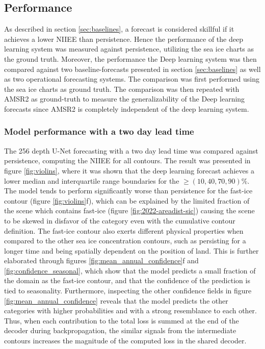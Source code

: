 \documentclass[../main/thesis]{subfiles}
\begin{document}
\subsection{Performance}
As described in section \ref{sec:baselines}, a forecast is considered skillful if it achieves a lower NIIEE than persistence. Hence the performance of the deep learning system was measured against persistence, utilizing the sea ice charts as the ground truth. Moreover, the performance the Deep learning system was then compared against two baseline-forecasts presented in section \ref{sec:baselines} as well as two operational forecasting systems. The comparison was first performed using the sea ice charts as ground truth. The comparison was then repeated with AMSR2 as ground-truth to measure the generalizability of the Deep learning forecasts since AMSR2 is completely independent of the deep learning system.

\subsubsection{Model performance with a two day lead time}
\label{sec:performance_confidence}
The 256 depth U-Net forecasting with a two day lead time was compared against persistence, computing the NIIEE for all contours. The result was presented in figure \ref{fig:violins}, where it was shown that the deep learning forecast achieves a lower median and interquartile range boundaries for the $\geq (10, 40, 70, 90)\%$. The model tends to perform significantly worse than persistence for the fast-ice contour (figure \ref{fig:violins}f), which can be explained by the limited fraction of the scene which contains fast-ice (figure \ref{fig:2022-areadist-sic}) causing the scene to be skewed in disfavor of the category even with the cumulative contour definition. The fast-ice contour also exerts different physical properties when compared to the other sea ice concentration contours, such as persisting for a longer time and being spatially dependent on the position of land. This is further elaborated through figures \ref{fig:mean_annual_confidence}f and \ref{fig:confidence_seasonal}, which show that the model predicts a small fraction of the domain as the fast-ice contour, and that the confidence of the prediction is tied to seasonality. Furthermore, inspecting the other confidence fields in figure \ref{fig:mean_annual_confidence} reveals that the model predicts the other categories with higher probabilities and with a strong resemblance to each other. Thus, when each contribution to the total loss is summed at the end of the decoder during backpropagation, the similar signals from the intermediate contours increases the magnitude of the computed loss in the shared decoder.
\end{document}

